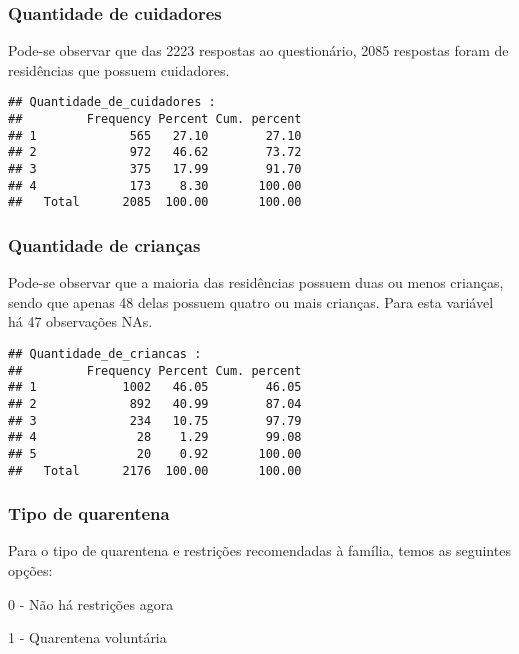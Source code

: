 \documentclass[
]{article}
\begin{document}
\hypertarget{quantidade-de-cuidadores}{%
\subsubsection{\texorpdfstring{\textbf{Quantidade de
cuidadores}}{Quantidade de cuidadores}}\label{quantidade-de-cuidadores}}

Pode-se observar que das 2223 respostas ao questionário, 2085 respostas
foram de residências que possuem cuidadores.

\begin{verbatim}
## Quantidade_de_cuidadores : 
##         Frequency Percent Cum. percent
## 1             565   27.10        27.10
## 2             972   46.62        73.72
## 3             375   17.99        91.70
## 4             173    8.30       100.00
##   Total      2085  100.00       100.00
\end{verbatim}

\hypertarget{quantidade-de-crianuxe7as}{%
\subsubsection{\texorpdfstring{\textbf{Quantidade de
crianças}}{Quantidade de crianças}}\label{quantidade-de-crianuxe7as}}

Pode-se observar que a maioria das residências possuem duas ou menos
crianças, sendo que apenas 48 delas possuem quatro ou mais crianças.
Para esta variável há 47 observações NAs.

\begin{verbatim}
## Quantidade_de_criancas : 
##         Frequency Percent Cum. percent
## 1            1002   46.05        46.05
## 2             892   40.99        87.04
## 3             234   10.75        97.79
## 4              28    1.29        99.08
## 5              20    0.92       100.00
##   Total      2176  100.00       100.00
\end{verbatim}

\hypertarget{tipo-de-quarentena}{%
\subsubsection{\texorpdfstring{\textbf{Tipo de
quarentena}}{Tipo de quarentena}}\label{tipo-de-quarentena}}

Para o tipo de quarentena e restrições recomendadas à família, temos as
seguintes opções:

0 - Não há restrições agora

1 - Quarentena voluntária
\end{document}

